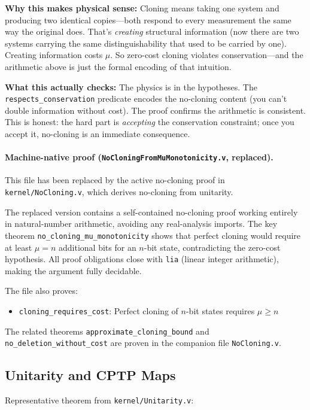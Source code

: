 \textbf{Why this makes physical sense:} Cloning means taking one system and producing two identical copies---both respond to every measurement the same way the original does. That's \textit{creating} structural information (now there are two systems carrying the same distinguishability that used to be carried by one). Creating information costs $\mu$. So zero-cost cloning violates conservation---and the arithmetic above is just the formal encoding of that intuition.

\textbf{What this actually checks:} The physics is in the hypotheses. The \texttt{respects\_conservation} predicate encodes the no-cloning content (you can't double information without cost). The proof confirms the arithmetic is consistent. This is honest: the hard part is \textit{accepting} the conservation constraint; once you accept it, no-cloning is an immediate consequence.

\paragraph{Machine-native proof (\texttt{NoCloningFromMuMonotonicity.v}, replaced).}
This file has been replaced by the active no-cloning proof in \texttt{kernel/NoCloning.v}, which derives no-cloning from unitarity.

The replaced version contains a self-contained no-cloning proof working entirely in natural-number arithmetic, avoiding any real-analysis imports. The key theorem \texttt{no\_cloning\_mu\_monotonicity} shows that perfect cloning would require at least $\mu = n$ additional bits for an $n$-bit state, contradicting the zero-cost hypothesis. All proof obligations close with \texttt{lia} (linear integer arithmetic), making the argument fully decidable.

The file also proves:
\begin{itemize}
    \item \texttt{cloning\_requires\_cost}: Perfect cloning of $n$-bit states requires $\mu \geq n$
\end{itemize}

The related theorems \texttt{approximate\_cloning\_bound} and \texttt{no\_deletion\_without\_cost} are proven in the companion file \texttt{NoCloning.v}.

\subsection{Unitarity and CPTP Maps}

Representative theorem from \texttt{kernel/Unitarity.v}:

